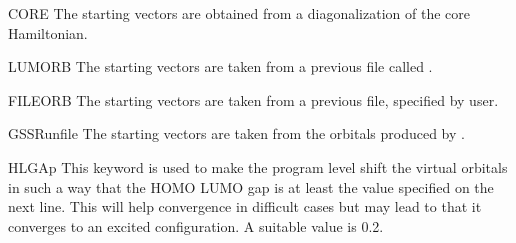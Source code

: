 \begin{keywordlist}
\item[CORE]
The starting vectors are obtained from a diagonalization of the core
Hamiltonian.
\item[LUMORB]
The starting vectors are taken from a previous  file called
.
\item[FILEORB]
The starting vectors are taken from a previous  file, specified by user.
\item[GSSRunfile]
The starting vectors are taken from the orbitals produced by .
\item[HLGAp]
This keyword is used to make the program level shift the virtual
orbitals in such a way that the HOMO LUMO gap is at least the value
specified on the next line. This will help convergence in difficult
cases but may lead to that it converges to an excited configuration.
A suitable value is 0.2.
\end{keywordlist}



